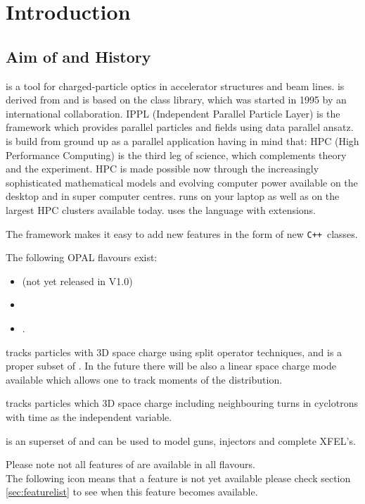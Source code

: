 \chapter{Introduction}
\label{sec:Introduction}


\section{Aim of \opal and History}
\opal is a tool for charged-particle optics in
accelerator structures and beam lines. \opal is derived from \madninep and is based 
on the
 class library,
which was started in 1995 by an international collaboration.  IPPL (Independent Parallel Particle Layer) is
the framework which provides parallel particles and fields using data parallel ansatz. \opal is build from ground up
as a parallel application having in mind that: HPC (High Performance Computing) is the third leg of 
science, which complements theory and the experiment. HPC is made possible now through the increasingly sophisticated mathematical models and evolving computer power available on the desktop
and in super computer centres. \opal runs on your laptop as well as on the largest HPC clusters available today. \opal uses the \mad language with extensions.

The \opal framework makes it easy to add new features in the form of new
\texttt{C++}~classes.

The following OPAL flavours exist:
\begin{itemize}
\item \opalmap (not yet released in V1.0)
\item \opalcycl 
\item \opalt .
\end{itemize}

\opalmap tracks particles with 3D space charge using split operator techniques, and is a proper subset of \madninep. In the future there will be also a linear space charge mode available
which allows one to track moments of the distribution. 

\opalcycl tracks particles which 3D space charge including neighbouring turns in cyclotrons
with time as the independent variable. 

\opalt is an superset of \impactt \cite{qiang2005} and can be used to model guns, injectors and complete XFEL's.

Please note not all features of \opal are available in all flavours.\\ The following icon \noopalt means that a feature is not yet 
available please check section \ref{sec:featurelist} to see when this feature becomes available.

